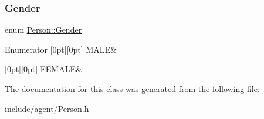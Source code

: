 \subsubsection{\texorpdfstring{Gender}{Gender}}
{\footnotesize\ttfamily enum \hyperlink{class_person_aff84ca16bd4dbf364614d86f20b29dd2}{Person\+::\+Gender}}

\begin{DoxyEnumFields}{Enumerator}
[0pt][0pt]{}\mbox{\label{class_person_aff84ca16bd4dbf364614d86f20b29dd2a16691f7cc6595f87b71d9b43ad23fcb4}} 
M\+A\+LE&\\
\hline

[0pt][0pt]{}\mbox{\label{class_person_aff84ca16bd4dbf364614d86f20b29dd2a8ee21010fb2d8e8794ef72be368da064}} 
F\+E\+M\+A\+LE&\\
\hline

\end{DoxyEnumFields}


The documentation for this class was generated from the following file\+:\begin{DoxyCompactItemize}
\item 
include/agent/\hyperlink{_person_8h}{Person.\+h}\end{DoxyCompactItemize}
